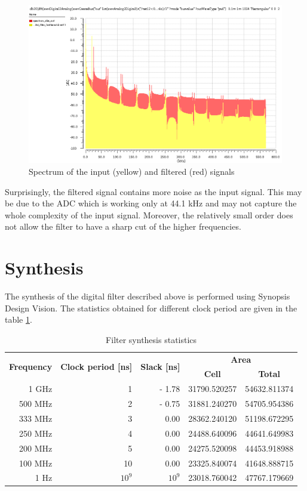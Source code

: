 \begin{figure}[!h]
	\centering 
	\includegraphics[scale=0.6]{images/Filter/spectrum.png}
	\caption{Spectrum of the input (yellow) and filtered (red) signals}
	\label{fig:filterCadenceTestbenchSpectrum}
\end{figure} 

Surprisingly, the filtered signal contains more noise as the input signal. This may be due to the ADC which is working only at 44.1 kHz and may not capture the whole complexity of the input signal. Moreover, the relatively small order does not allow the filter to have a sharp cut of the higher frequencies.

\section{Synthesis}

The synthesis of the digital filter described above is performed using Synopsis Design Vision. The statistics obtained for different clock period are given in the table \ref{table:synthesisStats}.

\begin{table}[!h]
	\centering
	\begin{tabular}{|r|r|r|r|r|}
		\hline
		 \multirow{2}{*}{\textbf{Frequency}}
		 & \multirow{2}{*}{\textbf{Clock period [ns]}}
		 & \multirow{2}{*}{\textbf{Slack [ns]}} & \multicolumn{2}{c|}{\textbf{Area}} \\
		 \cline{4-5}
		 & & & \multicolumn{1}{c|}{\textbf{Cell}} & \multicolumn{1}{c|}{\textbf{Total}} \\
		\hline
		 1 GHz & 1 & - 1.78 & 31790.520257 & 54632.811374 \\
		 500 MHz & 2 & - 0.75 & 31881.240270 & 54705.954386 \\
		 \rowcolor{Blue}
		 333 MHz & 3 & 0.00 & 28362.240120 & 51198.672295 \\
		 250 MHz & 4 & 0.00 & 24488.640096 & 44641.649983 \\
		 200 MHz & 5 & 0.00 & 24275.520098 & 44453.918988 \\
		 \rowcolor{Green}
		 100 MHz & 10 & 0.00 & 23325.840074 & 41648.888715 \\
		 1 Hz & $10^{9}$ & ~$10^{9}$ & 23018.760042 & 47767.179669 \\
		\hline
	\end{tabular}
	\label{table:synthesisStats}
	\caption{Filter synthesis statistics}
\end{table} 


